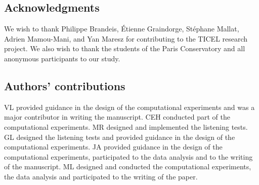 \documentclass{bmcart}
\newcommand{\nmu}{}
\begin{document}
\begin{backmatter}
\subsection*{\nmu Acknowledgments}

We wish to thank Philippe Brandeis, \'{E}tienne Graindorge, St\'{e}phane Mallat, Adrien Mamou-Mani, and Yan Maresz for contributing to the TICEL research project.
We also wish to thank the students of the Paris Conservatory and all anonymous participants to our study.

\subsection*{Authors' contributions}

VL provided guidance in the design of the computational experiments and was a major contributor in writing the manuscript. CEH conducted part of the computational experiments. MR designed and implemented the listening tests. GL designed the listening tests and provided guidance in the design of the computational experiments. JA provided guidance in the design of the computational experiments, participated to the data analysis and  to the writing of the manuscript. ML designed and conducted the computational experiments, the data analysis and participated to the writing of the paper.





\end{backmatter}
\end{document}

